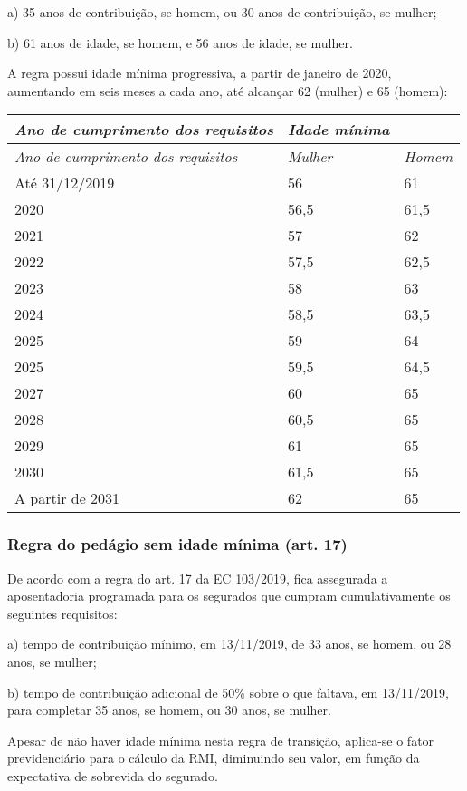 \documentclass[
  letterpaper,
  DIV=11,
  numbers=noendperiod]{scrartcl}
\begin{document}
a) 35 anos de contribuição, se homem, ou 30 anos de contribuição, se
mulher;

b) 61 anos de idade, se homem, e 56 anos de idade, se mulher.

A regra possui idade mínima progressiva, a partir de janeiro de 2020,
aumentando em seis meses a cada ano, até alcançar 62 (mulher) e 65
(homem):

\begin{longtable}[]{@{}lll@{}}
\toprule\noalign{}
\emph{Ano de cumprimento dos requisitos} & \emph{Idade mínima} & \\
\midrule\noalign{}
\endhead
\bottomrule\noalign{}
\endlastfoot
\emph{Ano de cumprimento dos requisitos} & \emph{Mulher} &
\emph{Homem} \\
Até 31/12/2019 & 56 & 61 \\
2020 & 56,5 & 61,5 \\
2021 & 57 & 62 \\
2022 & 57,5 & 62,5 \\
2023 & 58 & 63 \\
2024 & 58,5 & 63,5 \\
2025 & 59 & 64 \\
2025 & 59,5 & 64,5 \\
2027 & 60 & 65 \\
2028 & 60,5 & 65 \\
2029 & 61 & 65 \\
2030 & 61,5 & 65 \\
A partir de 2031 & 62 & 65 \\
\end{longtable}

\hypertarget{regra-do-peduxe1gio-sem-idade-muxednima-art.-17}{%
\subsubsection{Regra do pedágio sem idade mínima (art.
17)}\label{regra-do-peduxe1gio-sem-idade-muxednima-art.-17}}

De acordo com a regra do art. 17 da EC 103/2019, fica assegurada a
aposentadoria programada para os segurados que cumpram cumulativamente
os seguintes requisitos:

a) tempo de contribuição mínimo, em 13/11/2019, de 33 anos, se homem, ou
28 anos, se mulher;

b) tempo de contribuição adicional de 50\% sobre o que faltava, em
13/11/2019, para completar 35 anos, se homem, ou 30 anos, se mulher.

Apesar de não haver idade mínima nesta regra de transição, aplica-se o
fator previdenciário para o cálculo da RMI, diminuindo seu valor, em
função da expectativa de sobrevida do segurado.
\end{document}
